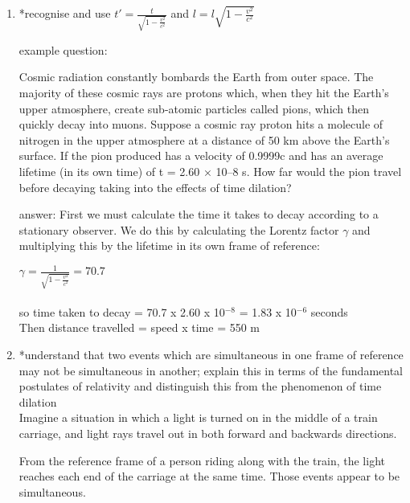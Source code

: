 \documentclass[main.tex]{subfiles}
\begin{document}
\begin{enumerate}
\item *recognise and use $t'=\frac{t}{\sqrt{1-\frac{v^2}{c^2}}}$ and $l=l\sqrt{1-\frac{v^2}{c^2}}$

example question: 

Cosmic radiation constantly bombards the Earth from outer space. The majority of these cosmic rays are protons which, when they hit the Earth’s upper atmosphere, create sub-atomic particles called pions, which then quickly decay into muons. Suppose a cosmic ray proton hits a molecule of nitrogen in the upper atmosphere at a distance of 50 km above the Earth’s surface. If the pion produced has a velocity of 0.9999c and has an average lifetime (in its own time) of t = 2.60 × 10–8 s. How far would the pion travel before decaying taking into the effects of time dilation?

answer: First we must calculate the time it takes to decay according to a stationary observer. We do this by calculating the Lorentz factor $\gamma$ and multiplying this by the lifetime in its own frame of reference:

$\gamma = \frac{1}{\sqrt{1-\frac{v^2}{c^2}}} = 70.7$
\\
\\
so time taken to decay = 70.7 x 2.60 x 10$^{-8}$ = 1.83 x 10$^{-6}$ seconds
\\
Then distance travelled = speed x time = 550 m

\item *understand that two events which are simultaneous in one frame of reference may not be
simultaneous in another; explain this in terms of the fundamental postulates of relativity and distinguish
this from the phenomenon of time dilation
\\

Imagine a situation in which a light is turned on in the middle of a train carriage, and light rays travel out in both forward and backwards directions. 
\\
\begin{figure}[h]
	\begin{center}
		
		
	\end{center}
\end{figure}
From the reference frame of a person riding along with the train, the light reaches each end of the carriage at the same time. Those events appear to be simultaneous.
\\
\begin{figure}[h]
	\begin{center}
		

\end{center}
\end{figure}
\end{enumerate}
\end{document}
